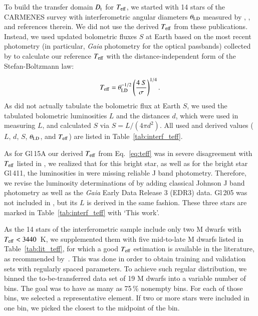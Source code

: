 \documentclass{aa}
\begin{document}
To build the transfer domain $D_{\rm t}$ for $T_{\rm eff}$, we started with 14 stars of the CARMENES survey with interferometric angular diameters $\theta_{\rm LD}$ measured by \cite{Boyajian2012}, \cite{vonBraun2014}, and references therein.
We did not use the derived $T_{\rm eff}$ from these publications.
Instead, we used updated bolometric fluxes $S$ at Earth based on the most recent photometry (in particular, {\it Gaia} photometry for the optical passbands) collected by \citet{cifuentes2020carmenes} to calculate our reference $T_{\rm eff}$ with the distance-independent form of the Stefan-Boltzmann law:

\begin{equation}
\label{eq:teff}
T_{\rm eff} = \theta_{\rm LD}^{-1/2} \left(\frac{4 ~ S}{\sigma}\right)^{1/4}.
\end{equation}
As \citet{cifuentes2020carmenes} did not actually tabulate the bolometric flux at Earth $S$, we used the tabulated bolometric luminosities $L$ and the distances $d$, which were used in measuring $L$, and calculated $S$ via $S=L/(4\pi d^2)$.
All used and derived values ($L$, $d$, $S$, $\theta_{\rm LD}$, and $T_{\rm eff}$) are listed in Table~\ref{tab:interf_teff}.

As for Gl\,15A our derived $T_{\rm eff}$ from Eq.~\ref{eq:teff} was in severe disagreement with $T_{\rm eff}$ listed in \cite{Boyajian2012}, we realized that for this bright star, as well as for the bright star Gl\,411, the luminosities in \cite{cifuentes2020carmenes} were missing reliable J band photometry. Therefore, we revise the luminosity determinations of \cite{cifuentes2020carmenes} by adding classical Johnson J band photometry as well as the {\it Gaia} Early Data Release 3 (EDR3) data. Gl\,205 was not included in \cite{cifuentes2020carmenes}, but its $L$ is derived in the same fashion. These three stars are marked in Table~\ref{tab:interf_teff} with `This work'.

As the 14 stars of the interferometric sample include only two M dwarfs with $T_{\rm eff} < 3440$~K, we supplemented them with five mid-to-late M dwarfs listed in Table~\ref{tab:lit_teff}, for which a good $T_{\rm eff}$ estimation is available in the literature, as recommended by~\citet{Passegger2022}.
This was done in order to obtain training and validation sets with regularly spaced parameters. To achieve such regular distribution, we binned the to-be-transferred data set of 19 M dwarfs into a variable number of bins.
The goal was to have as many as 75\,\% nonempty bins. For each of those bins, we selected a representative element.
If two or more stars were included in one bin, we picked the closest to the midpoint of the bin.
\end{document}
